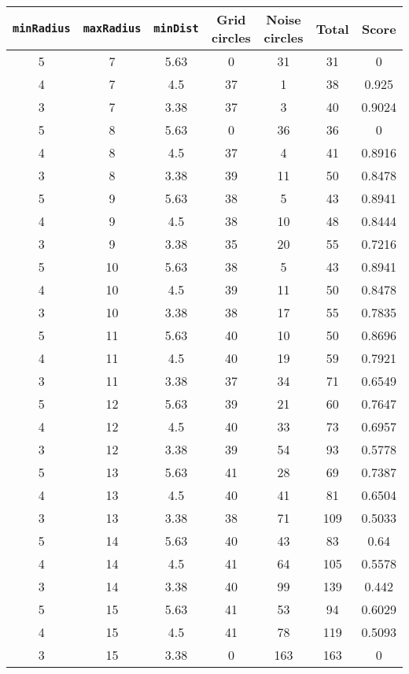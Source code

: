 \documentclass[letterpaper, 12pt]{article}
\begin{document}
\begin{longtable}{|c|c|c|c|c|c|c|}
\hline
\textbf{\texttt{minRadius}} & \textbf{\texttt{maxRadius}} & \textbf{\texttt{minDist}} & \textbf{Grid circles} & \textbf{Noise circles} & \textbf{Total} & \textbf{Score} \\
\hline
5 & 7 & 5.63 & 0 & 31 & 31 & 0 \\
\hline
4 & 7 & 4.5 & 37 & 1 & 38 & 0.925 \\
\hline
3 & 7 & 3.38 & 37 & 3 & 40 & 0.9024 \\
\hline
5 & 8 & 5.63 & 0 & 36 & 36 & 0 \\
\hline
4 & 8 & 4.5 & 37 & 4 & 41 & 0.8916 \\
\hline
3 & 8 & 3.38 & 39 & 11 & 50 & 0.8478 \\
\hline
5 & 9 & 5.63 & 38 & 5 & 43 & 0.8941 \\
\hline
4 & 9 & 4.5 & 38 & 10 & 48 & 0.8444 \\
\hline
3 & 9 & 3.38 & 35 & 20 & 55 & 0.7216 \\
\hline
5 & 10 & 5.63 & 38 & 5 & 43 & 0.8941 \\
\hline
4 & 10 & 4.5 & 39 & 11 & 50 & 0.8478 \\
\hline
3 & 10 & 3.38 & 38 & 17 & 55 & 0.7835 \\
\hline
5 & 11 & 5.63 & 40 & 10 & 50 & 0.8696 \\
\hline
4 & 11 & 4.5 & 40 & 19 & 59 & 0.7921 \\
\hline
3 & 11 & 3.38 & 37 & 34 & 71 & 0.6549 \\
\hline
5 & 12 & 5.63 & 39 & 21 & 60 & 0.7647 \\
\hline
4 & 12 & 4.5 & 40 & 33 & 73 & 0.6957 \\
\hline
3 & 12 & 3.38 & 39 & 54 & 93 & 0.5778 \\
\hline
5 & 13 & 5.63 & 41 & 28 & 69 & 0.7387 \\
\hline
4 & 13 & 4.5 & 40 & 41 & 81 & 0.6504 \\
\hline
3 & 13 & 3.38 & 38 & 71 & 109 & 0.5033 \\
\hline
5 & 14 & 5.63 & 40 & 43 & 83 & 0.64 \\
\hline
4 & 14 & 4.5 & 41 & 64 & 105 & 0.5578 \\
\hline
3 & 14 & 3.38 & 40 & 99 & 139 & 0.442 \\
\hline
5 & 15 & 5.63 & 41 & 53 & 94 & 0.6029 \\
\hline
4 & 15 & 4.5 & 41 & 78 & 119 & 0.5093 \\
\hline
3 & 15 & 3.38 & 0 & 163 & 163 & 0 \\

\end{longtable}
\end{document}
